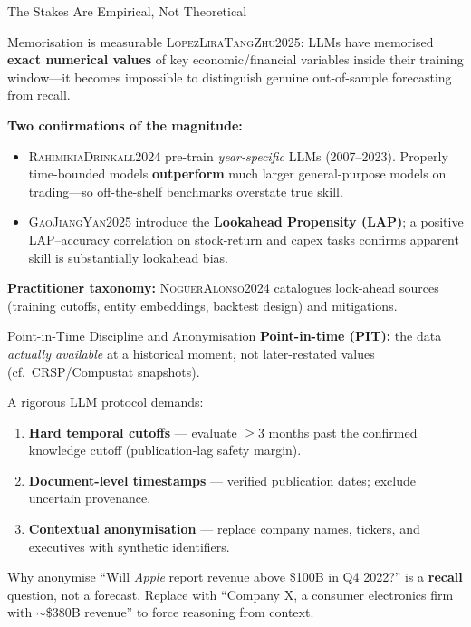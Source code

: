 \documentclass[9pt,t]{beamer}
\newcommand{\citesrc}[1]{\textsc{\small #1}}
\providecommand{\citet}[1]{\citesrc{#1}}
\begin{document}
\begin{frame}{The Stakes Are Empirical, Not Theoretical}
\begin{alertblock}{Memorisation is measurable}
\citet{LopezLiraTangZhu2025}: LLMs have memorised \textbf{exact numerical
values} of key economic/financial variables inside their training window---it
becomes impossible to distinguish genuine out-of-sample forecasting from recall.
\end{alertblock}

\medskip
\textbf{Two confirmations of the magnitude:}
\begin{itemize}
  \item \citet{RahimikiaDrinkall2024} pre-train \emph{year-specific} LLMs
        (2007--2023). Properly time-bounded models \textbf{outperform} much
        larger general-purpose models on trading---so off-the-shelf benchmarks
        overstate true skill.
  \item \citet{GaoJiangYan2025} introduce the \textbf{Lookahead Propensity
        (LAP)}; a positive LAP--accuracy correlation on stock-return and
        capex tasks confirms apparent skill is substantially lookahead bias.
\end{itemize}

\medskip
\textbf{Practitioner taxonomy:} \citet{NoguerAlonso2024} catalogues look-ahead
sources (training cutoffs, entity embeddings, backtest design) and mitigations.
\end{frame}

\begin{frame}{Point-in-Time Discipline and Anonymisation}
\textbf{Point-in-time (PIT):} the data \emph{actually available} at a historical
moment, not later-restated values (cf.\ CRSP/Compustat snapshots).

\medskip
\begin{underhood}
A rigorous LLM protocol demands:
\begin{enumerate}
  \item \textbf{Hard temporal cutoffs} --- evaluate $\geq 3$ months past the
        confirmed knowledge cutoff (publication-lag safety margin).
  \item \textbf{Document-level timestamps} --- verified publication dates;
        exclude uncertain provenance.
  \item \textbf{Contextual anonymisation} --- replace company names, tickers,
        and executives with synthetic identifiers.
\end{enumerate}
\end{underhood}

\medskip
\begin{exampleblock}{Why anonymise}
``Will \emph{Apple} report revenue above \$100B in Q4 2022?'' is a
\textbf{recall} question, not a forecast. Replace with ``Company X, a consumer
electronics firm with $\sim$\$380B revenue'' to force reasoning from context.
\end{exampleblock}
\end{frame}
\end{document}
